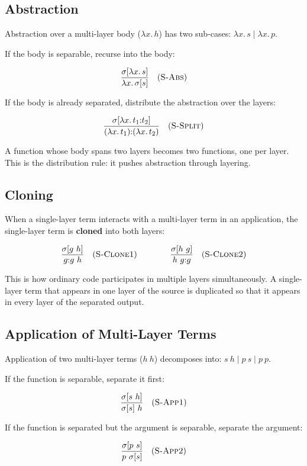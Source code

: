 \documentclass[11pt,letterpaper]{article}
\theoremstyle{definition}
\begin{document}
\subsection{Abstraction}

Abstraction over a multi-layer body ($\lambda x.\,h$) has two sub-cases:
$\lambda x.\,s \mid \lambda x.\,p$.

If the body is separable, recurse into the body:

$$
\dfrac{\sigma[\lambda x.\,s]}{\lambda x.\,\sigma[s]}
\quad (\textsc{S-Abs})
$$

If the body is already separated, distribute the abstraction over the layers:

$$
\dfrac{\sigma[\lambda x.\,t_1{:}t_2]}{(\lambda x.\,t_1){:}(\lambda x.\,t_2)}
\quad (\textsc{S-Split})
$$

A function whose body spans two layers becomes two functions, one per layer.
This is the distribution rule: it pushes abstraction through layering.

\subsection{Cloning}

When a single-layer term interacts with a multi-layer term in an application,
the single-layer term is \textbf{cloned} into both layers:

$$
\dfrac{\sigma[g\ h]}{g{:}g\ h}
\quad (\textsc{S-Clone1})
\qquad\qquad
\dfrac{\sigma[h\ g]}{h\ g{:}g}
\quad (\textsc{S-Clone2})
$$

This is how ordinary code participates in multiple layers simultaneously. A
single-layer term that appears in one layer of the source is duplicated so
that it appears in every layer of the separated output.

\subsection{Application of Multi-Layer Terms}

Application of two multi-layer terms ($h\ h$) decomposes into:
$s\ h \mid p\ s \mid p\ p$.

If the function is separable, separate it first:

$$
\dfrac{\sigma[s\ h]}{\sigma[s]\ h}
\quad (\textsc{S-App1})
$$

If the function is separated but the argument is separable, separate the
argument:

$$
\dfrac{\sigma[p\ s]}{p\ \sigma[s]}
\quad (\textsc{S-App2})
$$
\end{document}
